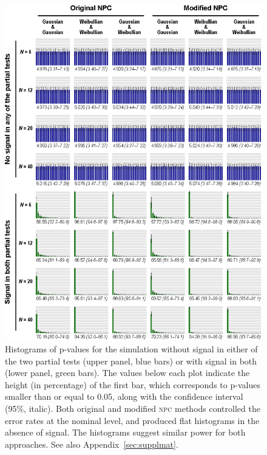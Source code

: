 \begin{figure}[p]
\begin{center}
\centerline{\includegraphics{images/validity_hist.eps}}
\end{center}
\vspace{-3mm}
\caption[Histograms of p-values for the simulations.]{Histograms of p-values for the simulation without signal in either of the two partial tests (upper panel, blue bars) or with signal in both (lower panel, green bars). The values below each plot indicate the height (in percentage) of the first bar, which corresponds to p-values smaller than or equal to 0.05, along with the confidence interval (95\%, italic). Both original and modified \textsc{npc} methods controlled the error rates at the nominal level, and produced flat histograms in the absence of signal. The histograms suggest similar power for both approaches. See also Appendix~\ref{sec:supplmat}.}
\label{fig:comb:validity_hist}
\end{figure}

